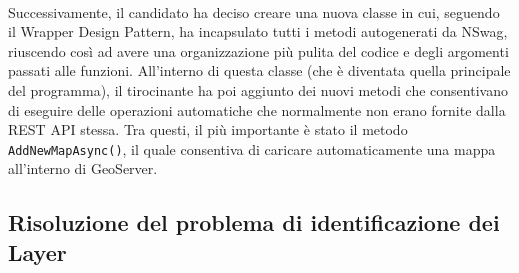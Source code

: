 \\Successivamente, il candidato ha deciso creare una nuova classe in cui, seguendo il Wrapper Design Pattern, ha incapsulato tutti i metodi autogenerati da NSwag, riuscendo così ad avere una organizzazione più pulita del codice e degli argomenti passati alle funzioni. All'interno di questa classe (che è diventata quella principale del programma), il tirocinante ha poi aggiunto dei nuovi metodi che consentivano di eseguire delle operazioni automatiche che normalmente non erano fornite dalla REST API stessa. Tra questi, il più importante è stato il metodo \verb|AddNewMapAsync()|, il quale consentiva di caricare automaticamente una mappa all'interno di GeoServer.

\subsection{Risoluzione del problema di identificazione dei Layer}

